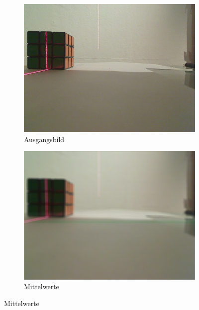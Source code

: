 \documentclass[ngerman,a4paper,parskip=half]{scrartcl}
\begin{document}
\begin{figure}
	\centering

	\begin{subfigure}{0.45\textwidth}
		\includegraphics[width=\textwidth]{includes/line_line.png}
		\caption{Ausgangsbild}
	\end{subfigure}
	\hfill
	\begin{subfigure}{0.45\textwidth}
		\includegraphics[width=\textwidth]{includes/line_peak_avg.png}
		\caption{Mittelwerte}
	\end{subfigure}


\end{figure}
\end{document}
